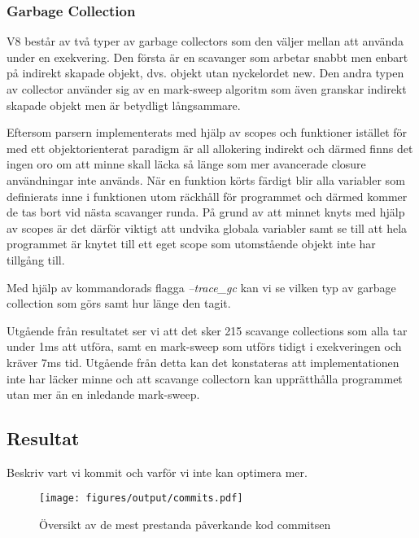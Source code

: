 \subsubsection{Garbage Collection}

V8 består av två typer av garbage collectors som den väljer mellan att använda
under en exekvering. Den första är en scavanger som arbetar snabbt men enbart
på indirekt skapade objekt, dvs. objekt utan nyckelordet new. Den andra typen
av collector använder sig av en mark-sweep algoritm som även granskar indirekt
skapade objekt men är betydligt långsammare\citep{ma10}.

Eftersom parsern implementerats med hjälp av scopes och funktioner istället
för med ett objektorienterat paradigm är all allokering indirekt och därmed
finns det ingen oro om att minne skall läcka så länge som mer avancerade
closure användningar inte används. När en funktion körts färdigt blir alla
variabler som definierats inne i funktionen utom räckhåll för programmet och
därmed kommer de tas bort vid nästa scavanger runda. På grund av att minnet
knyts med hjälp av scopes är det därför viktigt att undvika globala variabler
samt se till att hela programmet är knytet till ett eget scope som utomstående
objekt inte har tillgång till.

Med hjälp av kommandorads flagga \textit{--trace_gc} kan vi se vilken typ av
garbage collection som görs samt hur länge den tagit.

Utgående från resultatet ser vi att det sker 215 scavange collections som alla
tar under 1ms att utföra, samt en mark-sweep som utförs tidigt i exekveringen
och kräver 7ms tid. Utgående från detta kan det konstateras att
implementationen inte har läcker minne och att scavange collectorn kan
upprätthålla programmet utan mer än en inledande mark-sweep.

\subsection{Resultat}

Beskriv vart vi kommit och varför vi inte kan optimera mer.

\begin{figure}[ht]
  \texttt{[image: figures/output/commits.pdf]}
  \caption{Översikt av de mest prestanda påverkande kod commitsen}
\end{figure}

